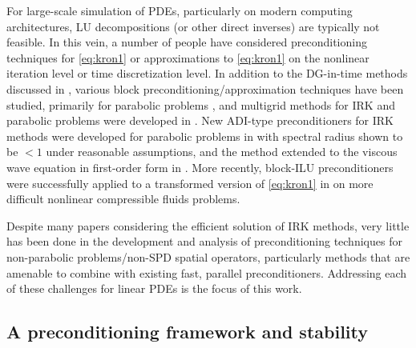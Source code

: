 \documentclass[review]{siamart}
\begin{document}
For large-scale simulation of PDEs, particularly on modern computing architectures,
LU decompositions (or other direct inverses) are typically not feasible. In this
vein, a number of people have considered preconditioning techniques for \eqref{eq:kron1}
or approximations to \eqref{eq:kron1} on the nonlinear iteration level or time
discretization level. In addition to the DG-in-time methods discussed in
, various block preconditioning/approximation techniques
have been studied, primarily for parabolic problems
\cite{houwen97b,Houwen97c,nissen11,mardel07,staff06,hoffmann97,jay00}, and
multigrid methods for IRK and parabolic problems were developed in \cite{vanlent05}.
New ADI-type preconditioners for IRK methods were developed for parabolic problems
in \cite{chen14} with spectral radius shown to be $<1$ under reasonable assumptions,
and the method extended to the viscous wave equation in first-order form in
\cite{chen16}. More recently, block-ILU preconditioners were successfully applied
to a transformed version of \eqref{eq:kron1} in \cite{pazner17} on more difficult
nonlinear compressible fluids problems.

Despite many papers considering the efficient solution of IRK methods, very little
has been done in the development and analysis of preconditioning techniques for
non-parabolic problems/non-SPD spatial operators, particularly methods that are
amenable to combine with existing fast, parallel preconditioners. Addressing each
of these challenges for linear PDEs is the focus of this work.

\subsection{A preconditioning framework and stability}\label{sec:intro:stab}
\end{document}
